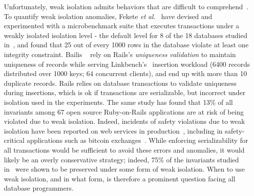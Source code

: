 Unfortunately, weak isolation admits behaviors that are difficult to
comprehend~\cite{berenson}. To quantify weak isolation anomalies,
Fekete \emph{et al.}~\cite{feketevldb09} have devised and experimented
with a microbenchmark suite that executes transactions under a weakly
isolated  isolation level - the default level for
8 of the 18 databases studied in~\cite{bailishotos}, and found that 25
out of every 1000 rows in the database violate at least one integrity
constraint. Bailis ~\cite{bailisferal} rely on Rails's
\emph{uniqueness validation} to maintain uniqueness of records while
serving Linkbench's~\cite{linkbench} insertion workload (6400 records
distributed over 1000 keys; 64 concurrent clients), and end up with
more than 10 duplicate records. Rails relies on database transactions
to validate uniqueness during insertions, which is ok if transactions
are serializable, but incorrect under  isolation
used in the experiments. The same study has found that 13\% of all
invariants among 67 open source Ruby-on-Rails applications are at risk
of being violated due to weak isolation. Indeed, incidents of safety
violations due to weak isolation have been reported on web services in
production~\cite{starbucksbug, scimedbug}, including in
safety-critical applications such as bitcoin
exchanges~\cite{poloniexbug, bitcoinbug}. While enforcing
serializability for all transactions would be sufficient to avoid
these errors and anomalies, it would likely be an overly conservative
strategy; indeed, 75\% of the invariants studied in~\cite{bailisferal}
were shown to be preserved under some form of weak isolation.  When to
use weak isolation, and in what form, is therefore a prominent
question facing all database programmers.

